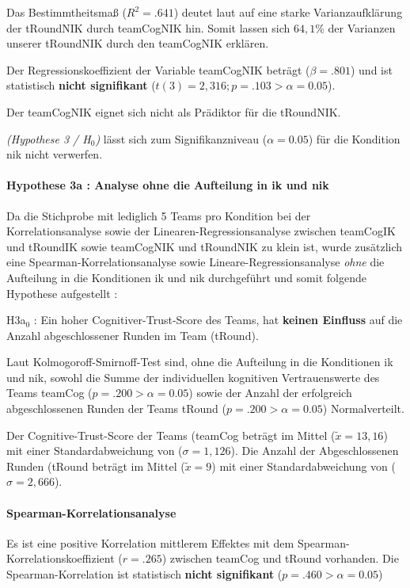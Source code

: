\documentclass[a4paper,11pt]{article}%
\renewcommand{\\}{\vspace*{0.5\baselineskip} \newline}
\begin{document}
Das Bestimmtheitsmaß ($R^{2} = .641$) deutet laut \citep{cohen2013statistical} auf eine starke Varianzaufklärung der \ac{tRoundNIK} durch \ac{teamCogNIK} hin. Somit lassen sich $64,1\%$ der Varianzen unserer \ac{tRoundNIK} durch den \ac{teamCogNIK} erklären.

Der Regressionskoeffizient der Variable \ac{teamCogNIK} beträgt ($\beta = .801$) und ist statistisch \textbf{nicht signifikant} ($t(3) = 2,316; p = .103 > \alpha = 0.05$).

Der \ac{teamCogNIK} eignet sich nicht als Prädiktor für die \ac{tRoundNIK}.

\textit{(Hypothese 3 / H$_{0}$)} lässt sich zum Signifikanzniveau ($\alpha = 0.05$) für die Kondition \ac{nik} nicht verwerfen.

\paragraph{Hypothese 3a : Analyse ohne die Aufteilung in \ac{ik} und \ac{nik} }
Da die Stichprobe mit lediglich 5 Teams pro Kondition bei der Korrelationsanalyse sowie der Linearen-Regressionsanalyse zwischen \ac{teamCogIK} und \ac{tRoundIK} sowie \ac{teamCogNIK} und \ac{tRoundNIK} zu klein ist, wurde zusätzlich eine Spearman-Korrelationsanalyse sowie Lineare-Regressionsanalyse \textit{ohne} die Aufteilung in die Konditionen \ac{ik} und \ac{nik} durchgeführt und somit folgende Hypothese aufgestellt :

H3a$_{0}$ : Ein hoher Cognitiver-Trust-Score des Teams, hat \textbf{keinen Einfluss} auf die Anzahl abgeschlossener Runden im Team (\ac{tRound}).

Laut Kolmogoroff-Smirnoff-Test sind, ohne die Aufteilung in die Konditionen \ac{ik} und \ac{nik}, sowohl die Summe der individuellen kognitiven Vertrauenswerte des Teams \ac{teamCog} ($p = .200 > \alpha = 0.05$) sowie der Anzahl der erfolgreich abgeschlossenen Runden der Teams \ac{tRound} ($p = .200 > \alpha = 0.05$) Normalverteilt.

Der Cognitive-Trust-Score der Teams (\ac{teamCog} beträgt im Mittel ($\tilde x = 13,16$) mit einer Standardabweichung von ($\sigma = 1,126$).
Die Anzahl der Abgeschlossenen Runden (\ac{tRound} beträgt im Mittel ($\tilde x = 9$) mit einer Standardabweichung von ($\sigma = 2,666$). 

			\paragraph{Spearman-Korrelationsanalyse}
Es ist eine positive Korrelation mittlerem Effektes mit dem Spearman-Korrelationskoeffizient ($r = .265$) zwischen \ac{teamCog} und \ac{tRound} vorhanden. Die Spearman-Korrelation ist statistisch \textbf{nicht signifikant} ($p = .460 > \alpha = 0.05$)
			
\end{document}
